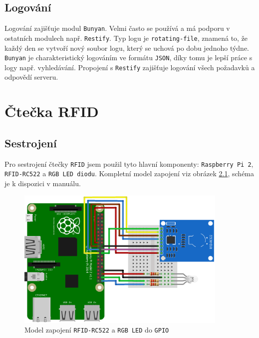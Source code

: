 \documentclass[czech,BP]{thesiskiv}
\begin{document}
	
	\section{Logování}
	Logování zajišťuje modul \texttt{Bunyan}. Velmi často se používá a má podporu v ostatních modulech např. \texttt{Restify}.
	Typ logu je \texttt{rotating-file}, znamená to, že každý den se vytvoří nový soubor logu, který se uchová po dobu jednoho týdne.
	\texttt{Bunyan} je charakteristický logováním ve formátu \texttt{JSON}, díky tomu je lepší práce s logy např. vyhledávání.
	Propojení s \texttt{Restify} zajišťuje logování všech požadavků a odpovědí serveru. 
	
	
	
	
	
	
	
	
	
	
	
	
	
	

	
	
\chapter{Čtečka RFID}
	\section{Sestrojení}
	
		Pro sestrojení čtečky \texttt{RFID} jsem použil tyto hlavní komponenty: \texttt{Raspberry Pi 2}, \texttt{RFID-RC522} a \texttt{RGB LED diodu}. 
		Kompletní model zapojení viz obrázek \ref{fig:reader_rfid_diagram}, schéma je k dispozici v manuálu.
		
\begin{figure}[H]
		\centering
		\includegraphics[width=0.9\textwidth]{../diagrams/reader_rfid_diagram_bb.png}	
		\caption{Model zapojení \texttt{RFID-RC522} a \texttt{RGB LED} do \texttt{GPIO}}
		\label{fig:reader_rfid_diagram}
	\end{figure}		
		
\end{document}
